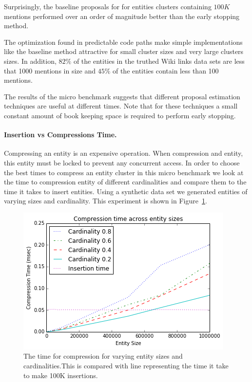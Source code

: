 Surprisingly, the baseline proposals for for entities clusters containing $100 K$ mentions
performed over an order of magnitude better than the early stopping method.

The optimization found in predictable code paths make simple implementations
like the baseline method attractive for small cluster sizes and very large clusters sizes.
In addition, $82\%$ of the entities in the truthed Wiki links data sets are less
that 1000 mentions in size and $45\%$ of the entities contain less than 100
mentions.

The results of the micro benchmark suggests that different proposal estimation
techniques are useful at different times.
Note that for these techniques a small constant amount of book keeping space is required to perform early stopping.


\paragraph{Insertion vs Compressions Time.}
Compressing an entity is an expensive operation.
When compression and entity, this entity must be locked to prevent any concurrent access.
In order to choose the best times to compress an entity cluster in this 
micro benchmark we look at the time to compression entity of different cardinalities
and compare them to the time it takes to insert entities. 
Using a synthetic data set we generated entities of varying sizes and cardinality.
This experiment is shown in Figure~\ref{fig:compression-v-insertion}. 


\begin{figure}
\centering
\includegraphics[width=\columnwidth]{media/compression-entitysize.png}
\caption{The time for compression for varying entity sizes and cardinalities.This is compared with line representing the time it take to make 100K insertions. }
\label{fig:compression-v-insertion}
\end{figure}

